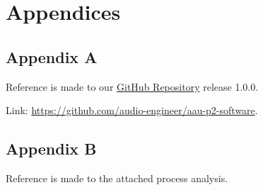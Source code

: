 \chapter*{Appendices}

\section*{Appendix A}\label{sec:appendix-a}

Reference is made to our \href{https://github.com/audio-engineer/aau-p2-software}{GitHub Repository} release 1.0.0.

Link: \url{https://github.com/audio-engineer/aau-p2-software}.

\section*{Appendix B}\label{sec:appendix-b}

Reference is made to the attached process analysis.
